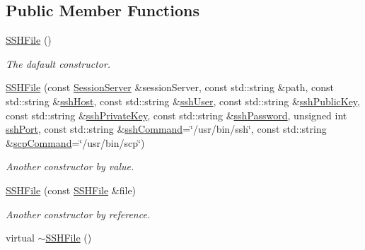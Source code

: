 \subsection*{Public Member Functions}
\begin{DoxyCompactItemize}
\item 
\hypertarget{classSSHFile_a211ff46a0d86240ed740543adedac050}{
\hyperlink{classSSHFile_a211ff46a0d86240ed740543adedac050}{SSHFile} ()}
\label{classSSHFile_a211ff46a0d86240ed740543adedac050}

\begin{DoxyCompactList}\small\item\em The dafault constructor. \item\end{DoxyCompactList}\item 
\hyperlink{classSSHFile_a290ef8ca31782187379af1d38cbf0598}{SSHFile} (const \hyperlink{classSessionServer}{SessionServer} \&sessionServer, const std::string \&path, const std::string \&\hyperlink{classSSHFile_a5a4a3d20457a33f57824b7defe7c2df5}{sshHost}, const std::string \&\hyperlink{classSSHFile_a4c6b4d096a6a9fd2043bcd24990f1ba1}{sshUser}, const std::string \&\hyperlink{classSSHFile_af11b98c5b07958117814b032f1ebbcd1}{sshPublicKey}, const std::string \&\hyperlink{classSSHFile_a31b70dd7571b49a4be99c40e1150a8fc}{sshPrivateKey}, const std::string \&\hyperlink{classSSHFile_a824e84e8d2ddfe669b6d824f06527c44}{sshPassword}, unsigned int \hyperlink{classSSHFile_affe979a9a81151e5094608ca9553745d}{sshPort}, const std::string \&\hyperlink{classSSHFile_a4c78048685325e41ae6ca61ab7c5cdc4}{sshCommand}=\char`\"{}/usr/bin/ssh\char`\"{}, const std::string \&\hyperlink{classSSHFile_a7ae092c6888e1e256346e393f7ac075e}{scpCommand}=\char`\"{}/usr/bin/scp\char`\"{})
\begin{DoxyCompactList}\small\item\em Another constructor by value. \item\end{DoxyCompactList}\item 
\hyperlink{classSSHFile_a549e78912b9f41dcd939078fe6f15a8f}{SSHFile} (const \hyperlink{classSSHFile}{SSHFile} \&file)
\begin{DoxyCompactList}\small\item\em Another constructor by reference. \item\end{DoxyCompactList}\item 
\hypertarget{classSSHFile_a9d2d77fd758375e3fc4dd8e31d5c7e1c}{
virtual \hyperlink{classSSHFile_a9d2d77fd758375e3fc4dd8e31d5c7e1c}{$\sim$SSHFile} ()}
\label{classSSHFile_a9d2d77fd758375e3fc4dd8e31d5c7e1c}


\end{DoxyCompactItemize}
